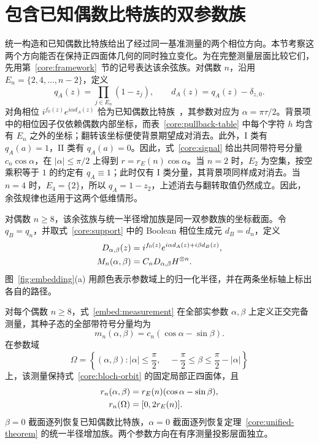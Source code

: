 \section{包含已知偶数比特族的双参数族}
\label{embed:section}

统一构造和已知偶数比特族给出了经过同一基准测量的两个相位方向。本节考察这两个方向能否在保持正四面体几何的同时独立变化。为在完整测量层面比较它们，先用第~\ref{core:framework}~节的记号表达该余弦族。对偶数 $n$，沿用
$E_n=\{2,4,\ldots,n-2\}$，定义
\begin{equation}
 q_A(z)=\prod_{j\in E_n}(1-z_j),\qquad d_A(z)=q_A(z)-\delta_{z,0}.
 \label{embed:and-support}
\end{equation}
对角相位 $i^{f_0(z)}e^{i\alpha d_A(z)}$ 恰为已知偶数比特族~\cite{PauwelsGisin2026}，其参数对应为 $\alpha=\pi\tau/2$。背景项中的相位因子仅依赖偶数内部坐标，而表~\ref{core:pullback-table} 中每个字符 $h$ 均含有 $E_n$ 之外的坐标；翻转该坐标便使背景期望成对消去。此外，I 类有 $q_A(a)=1$，II 类有 $q_A(a)=0$。因此，式~\eqref{core:signal} 给出共同带符号分量 $c_n\cos\alpha$，在 $|\alpha|\le\pi/2$ 上得到 $r=r_E(n)\cos\alpha$。当 $n=2$ 时，$E_2$ 为空集，按空乘积等于 $1$ 的约定有 $q_A\equiv1$；此时仅有 I 类分量，其背景项同样成对消去。当 $n=4$ 时，$E_4=\{2\}$，所以 $q_A=1-z_2$，上述消去与翻转取值仍然成立。因此，余弦规律也适用于这两个低维情形。

对偶数 $n\ge8$，该余弦族与统一半径增加族是同一双参数族的坐标截面。令 $q_B=q_n$，并取式~\eqref{core:support} 中的 Boolean 相位生成元 $d_B=d_n$，定义
\begin{align}
 D_{\alpha,\beta}(z)&=i^{f_0(z)}e^{i\alpha d_A(z)+i\beta d_B(z)},\notag\\
 M_n(\alpha,\beta)&=C_nD_{\alpha,\beta}H^{\otimes n}.
 \label{embed:measurement}
\end{align}
图~\ref{fig:embedding}(a) 用颜色表示参数域上的归一化半径，并在两条坐标轴上标出各自的路径。

\begin{theorem}[二维包含]
\label{embed:theorem}
对每个偶数 $n\ge8$，式~\eqref{embed:measurement} 在全部实参数 $\alpha,\beta$ 上定义正交完备测量，其种子态的全部带符号分量均为
\begin{equation}
 m_n(\alpha,\beta)=c_n(\cos\alpha-\sin\beta).
 \label{embed:component}
\end{equation}
在参数域
\begin{equation}
 \Omega=\left\{(\alpha,\beta): |\alpha|\le\frac\pi2,\quad
 -\frac\pi2\le\beta\le\frac\pi2-|\alpha|\right\}
 \label{embed:domain}
\end{equation}
上，该测量保持式~\eqref{core:bloch-orbit} 的固定局部正四面体，且
\begin{align}
 r_n(\alpha,\beta)&=r_E(n)(\cos\alpha-\sin\beta),\notag\\
 r_n(\Omega)&=[0,2r_E(n)].
 \label{embed:radius}
\end{align}
$\beta=0$ 截面逐列恢复已知偶数比特族，$\alpha=0$ 截面逐列恢复定理~\ref{core:unified-theorem} 的统一半径增加族。两个参数方向在有序测量投影层面独立。
\end{theorem}

